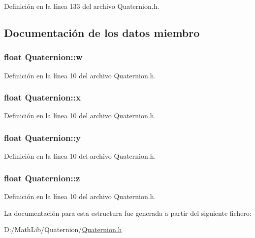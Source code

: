 Definición en la línea 133 del archivo Quaternion.h.



\subsection{Documentación de los datos miembro}
\hypertarget{struct_quaternion_aa44a65ab99e36f6ab8771030eed8a7ad}{
\subsubsection[{w}]{\setlength{\rightskip}{0pt plus 5cm}float {\bf Quaternion::w}}}
\label{struct_quaternion_aa44a65ab99e36f6ab8771030eed8a7ad}


Definición en la línea 10 del archivo Quaternion.h.

\hypertarget{struct_quaternion_a8b80f191a3155cc0158d2b4f4d50b2cb}{
\subsubsection[{x}]{\setlength{\rightskip}{0pt plus 5cm}float {\bf Quaternion::x}}}
\label{struct_quaternion_a8b80f191a3155cc0158d2b4f4d50b2cb}


Definición en la línea 10 del archivo Quaternion.h.

\hypertarget{struct_quaternion_a3bd3f270462944423611f44e19d2511b}{
\subsubsection[{y}]{\setlength{\rightskip}{0pt plus 5cm}float {\bf Quaternion::y}}}
\label{struct_quaternion_a3bd3f270462944423611f44e19d2511b}


Definición en la línea 10 del archivo Quaternion.h.

\hypertarget{struct_quaternion_a625cb732d8ff3083e7852b86b736ab29}{
\subsubsection[{z}]{\setlength{\rightskip}{0pt plus 5cm}float {\bf Quaternion::z}}}
\label{struct_quaternion_a625cb732d8ff3083e7852b86b736ab29}


Definición en la línea 10 del archivo Quaternion.h.



La documentación para esta estructura fue generada a partir del siguiente fichero:\begin{DoxyCompactItemize}
\item 
D:/MathLib/Quaternion/\hyperlink{_quaternion_8h}{Quaternion.h}\end{DoxyCompactItemize}
